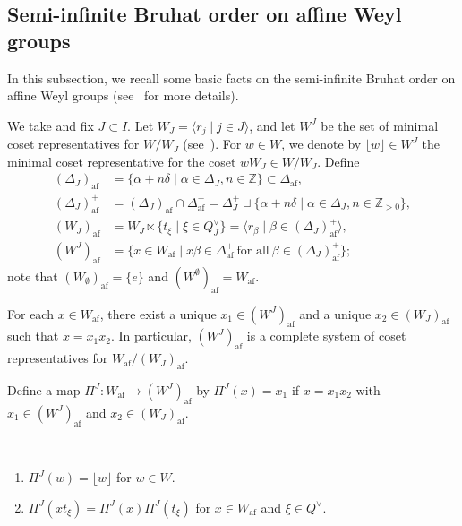 \documentclass[ALCO,ThmDefs,Unicode,epreuves]{cedram}
\newcommand{\BZ}{\mathbb{Z}}
\DeclareMathOperator{\af}{af}
\begin{document}
\subsection{Semi-infinite Bruhat order on affine Weyl groups} \label{Subsection:SiBO}

In this subsection, 
we recall some basic facts on 
the semi-infinite Bruhat order on affine Weyl groups 
(see~\cite{INS16,LS,P} for more details).

We take and fix $J \subset I$. 
Let $W_J = \langle r_j \mid j \in J \rangle$, 
and let 
$W^J$
be the set of minimal coset representatives for $W/W_J$ 
(see~\cite[Corollary~2.4.5~(i)]{BB}). 
For 
$w \in W$, 
we denote by 
$\lfloor w \rfloor \in W^J$ 
the minimal coset representative for the coset 
$wW_J \in W/W_J$.
Define
{
\begin{align}
(\Delta_J)_{\af} 
&=
\{ \alpha + n\delta \mid \alpha \in \Delta_J , n \in \BZ \} \subset \Delta_{\af}, \\%
(\Delta_J)_{\af}^+ 
&=
(\Delta_J)_{\af} \cap \Delta_{\af}^+ 
=
\Delta_J^+ 
\sqcup
\{ \alpha + n\delta \mid \alpha \in \Delta_J , n \in \BZ_{>0} \}, \\%
(W_J)_{\af}
&=
W_J \ltimes \{ t_{\xi} \mid \xi \in Q_J^{\vee} \}
=
\langle r_{\beta} \mid \beta \in (\Delta_J)_{\af}^+ \rangle , \label{eq:W_J_af} \\%
(W^J)_{\af} 
&=
\{ x \in W_{\af} \mid x\beta \in \Delta_{\af}^+ \ \text{for all} \ \beta \in (\Delta_J)_{\af}^+ \} ;
\end{align}}%
note that 
$(W_{\emptyset})_{\af} = \{ e \}$ 
and 
$(W^{\emptyset})_{\af} = W_{\af}$.

\begin{lemm} \label{lem:Waf-decomp}
For each $x \in W_{\af}$, 
there exist a unique $x_1 \in (W^J)_{\af}$
and a unique $x_2 \in (W_J)_{\af}$ such that
$x = x_1 x_2$. 
In particular, 
$(W^J)_{\af}$ 
is a complete system of coset representatives for 
$W_{\af} / (W_J)_{\af}$. 
\end{lemm}

Define a map 
$\Pi^J : W_{\af} \rightarrow (W^J)_{\af}$ 
by $\Pi^J(x) = x_1$ 
if $x = x_1 x_2$ with 
$x_1 \in (W^J)_{\af}$
and 
$x_2 \in (W_J)_{\af}$. 

\begin{lemm} \label{lem:Pi}\ \\[-1.2em]

\begin{enumerate}[label=(\arabic*)]
\item\label{Lemm2.3_1}
$\Pi^J(w) = \lfloor w \rfloor$ 
for $w \in W$.
\item \label{Lemm2.3_2}
$\Pi^J(x t_{\xi}) = \Pi^J(x) \Pi^J(t_{\xi})$
for $x \in W_{\af}$ and $\xi \in Q^{\vee}$.
\end{enumerate}
\end{lemm}
\end{document}
